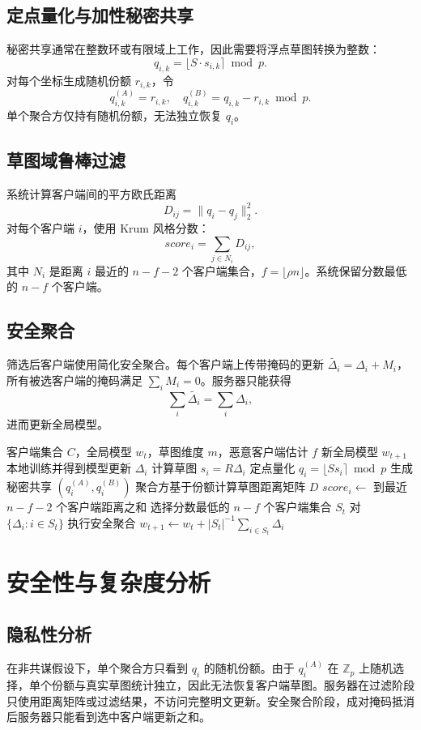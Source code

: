 \documentclass[UTF8,a4paper,zihao=-4]{ctexart}
\begin{document}
\subsection{定点量化与加性秘密共享}
秘密共享通常在整数环或有限域上工作，因此需要将浮点草图转换为整数：
\[
q_{i,k}=\lfloor S\cdot s_{i,k}\rceil\bmod p.
\]
对每个坐标生成随机份额 $r_{i,k}$，令
\[
q_{i,k}^{(A)}=r_{i,k},\quad q_{i,k}^{(B)}=q_{i,k}-r_{i,k}\bmod p.
\]
单个聚合方仅持有随机份额，无法独立恢复 $q_i$。

\subsection{草图域鲁棒过滤}
系统计算客户端间的平方欧氏距离
\[
D_{ij}=\|q_i-q_j\|_2^2.
\]
对每个客户端 $i$，使用 Krum 风格分数：
\[
score_i=\sum_{j\in N_i}D_{ij},
\]
其中 $N_i$ 是距离 $i$ 最近的 $n-f-2$ 个客户端集合，$f=\lfloor \rho n \rfloor$。系统保留分数最低的 $n-f$ 个客户端。

\subsection{安全聚合}
筛选后客户端使用简化安全聚合。每个客户端上传带掩码的更新 $\widetilde{\Delta_i}=\Delta_i+M_i$，所有被选客户端的掩码满足 $\sum_i M_i=0$。服务器只能获得
\[
\sum_i \widetilde{\Delta_i}=\sum_i \Delta_i,
\]
进而更新全局模型。

\begin{algorithm}[t]
\caption{PP-SRSF 鲁棒安全聚合流程}
\begin{algorithmic}[1]
\Require 客户端集合 $C$，全局模型 $w_t$，草图维度 $m$，恶意客户端估计 $f$
\Ensure 新全局模型 $w_{t+1}$
  \State 本地训练并得到模型更新 $\Delta_i$
  \State 计算草图 $s_i=R\Delta_i$
  \State 定点量化 $q_i=\lfloor S s_i\rceil\bmod p$
  \State 生成秘密共享 $(q_i^{(A)},q_i^{(B)})$
\EndFor
\State 聚合方基于份额计算草图距离矩阵 $D$
  \State $score_i\gets$ 到最近 $n-f-2$ 个客户端距离之和
\EndFor
\State 选择分数最低的 $n-f$ 个客户端集合 $S_t$
\State 对 $\{\Delta_i:i\in S_t\}$ 执行安全聚合
\State $w_{t+1}\gets w_t + |S_t|^{-1}\sum_{i\in S_t}\Delta_i$
\end{algorithmic}
\end{algorithm}

\section{安全性与复杂度分析}
\subsection{隐私性分析}
在非共谋假设下，单个聚合方只看到 $q_i$ 的随机份额。由于 $q_i^{(A)}$ 在 $\mathbb{Z}_p$ 上随机选择，单个份额与真实草图统计独立，因此无法恢复客户端草图。服务器在过滤阶段只使用距离矩阵或过滤结果，不访问完整明文更新。安全聚合阶段，成对掩码抵消后服务器只能看到选中客户端更新之和。
\end{document}
